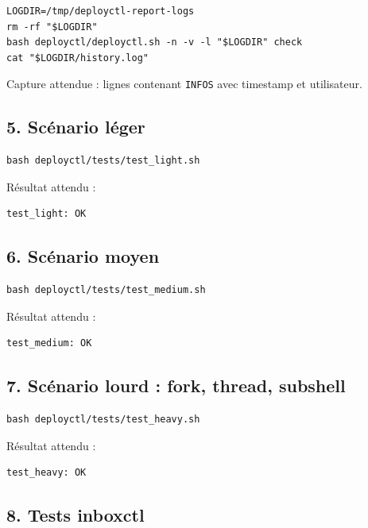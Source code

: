 \documentclass[12pt,a4paper]{article}
\begin{document}
\begin{lstlisting}
LOGDIR=/tmp/deployctl-report-logs
rm -rf "$LOGDIR"
bash deployctl/deployctl.sh -n -v -l "$LOGDIR" check
cat "$LOGDIR/history.log"
\end{lstlisting}

Capture attendue : lignes contenant \texttt{INFOS} avec timestamp et utilisateur.

\subsection{5. Scénario léger}

\begin{lstlisting}
bash deployctl/tests/test_light.sh
\end{lstlisting}

Résultat attendu :

\begin{lstlisting}
test_light: OK
\end{lstlisting}

\subsection{6. Scénario moyen}

\begin{lstlisting}
bash deployctl/tests/test_medium.sh
\end{lstlisting}

Résultat attendu :

\begin{lstlisting}
test_medium: OK
\end{lstlisting}

\subsection{7. Scénario lourd : fork, thread, subshell}

\begin{lstlisting}
bash deployctl/tests/test_heavy.sh
\end{lstlisting}

Résultat attendu :

\begin{lstlisting}
test_heavy: OK
\end{lstlisting}

\subsection{8. Tests inboxctl}
\end{document}
